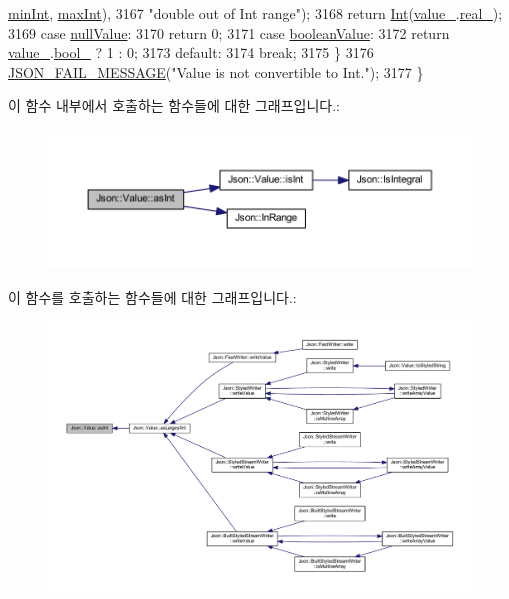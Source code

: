 \begin{DoxyCode}
      \hyperlink{class_json_1_1_value_a7df8a39e2502b8c92a6a41e3d752d2c8}{minInt}, \hyperlink{class_json_1_1_value_a978c799a8af3114ef7dab6fd0a310a1b}{maxInt}),
3167                         \textcolor{stringliteral}{"double out of Int range"});
3168     \textcolor{keywordflow}{return} \hyperlink{class_json_1_1_value_abdf7a7ff73eb130ffcab28504ffdb405}{Int}(\hyperlink{class_json_1_1_value_aef578244546212705b9f81eb84d7e151}{value\_}.\hyperlink{union_json_1_1_value_1_1_value_holder_af0c5ca724e5fe3a15db773d750e2351e}{real\_});
3169   \textcolor{keywordflow}{case} \hyperlink{namespace_json_a7d654b75c16a57007925868e38212b4ea7d9899633b4409bd3fc107e6737f8391}{nullValue}:
3170     \textcolor{keywordflow}{return} 0;
3171   \textcolor{keywordflow}{case} \hyperlink{namespace_json_a7d654b75c16a57007925868e38212b4ea14c30dbf4da86f7b809be299f671f7fd}{booleanValue}:
3172     \textcolor{keywordflow}{return} \hyperlink{class_json_1_1_value_aef578244546212705b9f81eb84d7e151}{value\_}.\hyperlink{union_json_1_1_value_1_1_value_holder_a92edab1861dadbfefd8be5fd4285eefe}{bool\_} ? 1 : 0;
3173   \textcolor{keywordflow}{default}:
3174     \textcolor{keywordflow}{break};
3175   \}
3176   \hyperlink{json_8h_a67007439f94bc6afc465923f56147ba1}{JSON\_FAIL\_MESSAGE}(\textcolor{stringliteral}{"Value is not convertible to Int."});
3177 \}
\end{DoxyCode}
이 함수 내부에서 호출하는 함수들에 대한 그래프입니다.\+:\nopagebreak
\begin{figure}[H]
\begin{center}
\leavevmode
\includegraphics[width=350pt]{class_json_1_1_value_a614d635bc248a592593feb322cd15ab8_cgraph}
\end{center}
\end{figure}
이 함수를 호출하는 함수들에 대한 그래프입니다.\+:\nopagebreak
\begin{figure}[H]
\begin{center}
\leavevmode
\includegraphics[width=350pt]{class_json_1_1_value_a614d635bc248a592593feb322cd15ab8_icgraph}
\end{center}
\end{figure}
